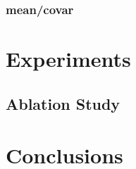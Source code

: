 \documentclass[10pt,twocolumn,letterpaper]{article}
\begin{document}
\subsubsection{mean/covar}






\section{Experiments}


\subsection{Ablation Study}



\section{Conclusions}







	
	
\end{document}
